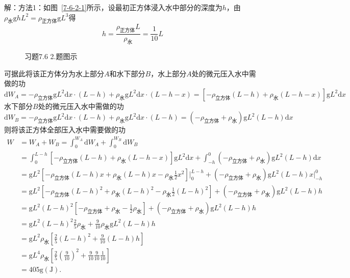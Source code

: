 \documentclass[12pt,UTF8]{ctexart}
\begin{document}
\begin{enumerate}
解：方法1：如图~\ref{7-6-2-1}所示，设最初正方体浸入水中部分的深度为$h$，由$\rho_{\text{水}}\mathrm ghL^2=\rho_{\text{正方体}}\mathrm gL^3$得\\
\[h=\frac{\rho_{\text{正方体}}L}{\rho_{\text{水}}}=\frac1{10}L\]
\begin{figure}[H]
\begin{center}
\end{center}
\caption{习题7.6 2.题图示}
\label{7-6-2}
\end{figure}
可据此将该正方体分为水上部分$A$和水下部分$B$，水上部分$A$处的微元压入水中需做的功
\[\mathrm dW_A=-\rho_{\text{立方体}}\mathrm gL^2\mathrm dx\cdot(L-h)+\rho_{\text{水}}\mathrm gL^2\mathrm dx\cdot(L-h-x)=[-\rho_{\text{立方体}}(L-h)+\rho_{\text{水}}(L-h-x)]\mathrm gL^2\mathrm dx\]
水下部分$B$处的微元压入水中需做的功
\[\mathrm dW_B=-\rho_{\text{立方体}}\mathrm gL^2\mathrm dx\cdot(L-h)+\rho_{\text{水}}\mathrm gL^2\mathrm dx\cdot(L-h)=(-\rho_{\text{立方体}}+\rho_{\text{水}})\mathrm gL^2(L-h)\mathrm dx\]
则将该正方体全部压入水中需要做的功
\[\begin{split}
W&=W_A+W_B=\int_0^{W_A}\mathrm dW_A+\int_0^{W_B}\mathrm dW_B\\
&=\int_0^{L-h}[-\rho_{\text{立方体}}(L-h)+\rho_{\text{水}}(L-h-x)]\mathrm gL^2\mathrm dx+\int_{-h}^0(-\rho_{\text{立方体}}+\rho_{\text{水}})\mathrm gL^2(L-h)\mathrm dx\\
&=\mathrm gL^2[-\rho_{\text{立方体}}(L-h)x+\rho_{\text{水}}(L-h)x-\rho_{\text{水}}\frac12x^2]\Big|_0^{L-h}+(-\rho_{\text{立方体}}+\rho_{\text{水}})\mathrm gL^2(L-h)x\Big|_{-h}^0\\
&=\mathrm gL^2[-\rho_{\text{立方体}}(L-h)^2+\rho_{\text{水}}(L-h)^2-\rho_{\text{水}}\frac12(L-h)^2]+(-\rho_{\text{立方体}}+\rho_{\text{水}})\mathrm gL^2(L-h)h\\
&=\mathrm gL^2(L-h)^2[-\rho_{\text{立方体}}+\rho_{\text{水}}-\frac12\rho_{\text{水}}]+(-\rho_{\text{立方体}}+\rho_{\text{水}})\mathrm gL^2(L-h)h\\
&=\mathrm gL^2(L-h)^2\frac25\rho_{\text{水}}+\frac9{10}\rho_{\text{水}}\mathrm gL^2(L-h)h\\
&=\mathrm gL^2\rho_{\text{水}}[\frac25(L-h)^2+\frac9{10}(L-h)h]\\
&=\mathrm gL^4\rho_{\text{水}}[\frac25(\frac9{10})^2+\frac9{10}\frac9{10}\frac1{10}]\\
&=405\mathrm g(\mathrm J).
\end{split}\]


\end{enumerate}
\end{document}
